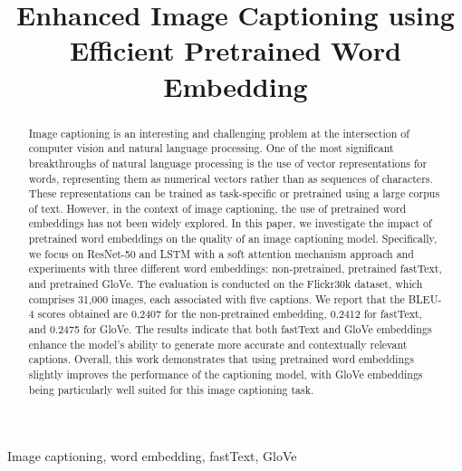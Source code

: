 \documentclass[conference]{IEEEtran}
\begin{document}
\title{Enhanced Image Captioning using\\Efficient Pretrained Word Embedding\\}
\author{
}
\maketitle

\begin{abstract}
Image captioning is an interesting and challenging problem at the intersection of computer vision and natural language processing.
One of the most significant breakthroughs of natural language processing is the use of vector representations for words, representing them as numerical vectors rather than as sequences of characters. These representations can be trained as task-specific or pretrained using a large corpus of text. However, in the context of image captioning, the use of pretrained word embeddings has not been widely explored.
In this paper, we investigate the impact of pretrained word embeddings on the quality of an image captioning model. Specifically, we focus on ResNet-50 and LSTM with a soft attention mechanism approach and experiments with three different word embeddings: non-pretrained, pretrained fastText, and pretrained GloVe. The evaluation is conducted on the Flickr30k dataset, which comprises 31,000 images, each associated with five captions.
We report that the BLEU-4 scores obtained are 0.2407 for the non-pretrained embedding, 0.2412 for fastText, and 0.2475 for GloVe. The results indicate that both fastText and GloVe embeddings enhance the model's ability to generate more accurate and contextually relevant captions. Overall, this work demonstrates that using pretrained word embeddings slightly improves the performance of the captioning model, with GloVe embeddings being particularly well suited for this image captioning task.
\end{abstract} 

\begin{IEEEkeywords}
Image captioning, word embedding, fastText, GloVe
\end{IEEEkeywords}
\end{document}
